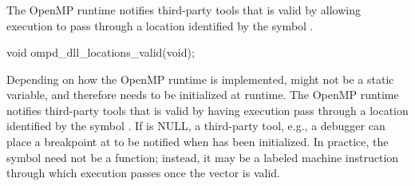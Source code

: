 \subsubsection{}
\label{subsubsec:ompd_dll_locations_valid}

\summary
The OpenMP runtime notifies third-party tools that 
is valid by allowing execution to pass through a location identified
by the symbol .


\begin{cspecific}
\begin{ompSyntax}
void ompd_dll_locations_valid(void);
\end{ompSyntax}
\end{cspecific}


\descr
Depending on how the OpenMP runtime is
implemented,  might not be a static
variable, and therefore needs to be initialized at runtime.  The
OpenMP runtime notifies third-party tools
that  is valid by having execution pass
through a location identified by the
symbol .
If  is NULL, a third-party tool, e.g., a
debugger can place a breakpoint at 
to be notified when  has been initialized.
In practice, the symbol  need not be
a function; instead, it may be a labeled machine instruction through
which execution passes once the vector is valid.


